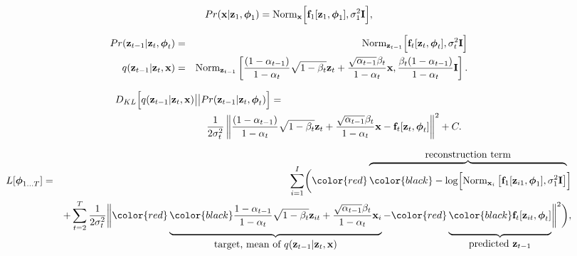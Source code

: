 \documentclass[letterpaper,twoside,openany, titlepage,oldfontcommands,titles,dvipsnames]{memoir}
\newcommand*\mystrut[1]{\vrule width0pt height0pt depth#1\relax}
\begin{document}
\begin{eqnarray}
  Pr(\mathbf{x}|\mathbf{z}_{1},\boldsymbol\phi_{1}) =\mbox{Norm}_{\mathbf{x}}\Bigl[\mbox{\bf f}_{1}[\mathbf{z}_{1},\boldsymbol\phi_{1}],\sigma_{1}^{2}\mathbf{I}\Bigr],
 \end{eqnarray}

\begin{eqnarray}\label{eq:diffusion_KL_normal_terms}
  Pr(\mathbf{z}_{t-1}|\mathbf{z}_{t},\boldsymbol\phi_{t}) &=& \mbox{Norm}_{\mathbf{z}_{t-1}}\Bigl[\mbox{\bf f}_{t}[\mathbf{z}_{t},\boldsymbol\phi_{t}],\sigma_{t}^{2}\mathbf{I}\Bigr]\\
 q(\mathbf{z}_{t-1}|\mathbf{z}_{t},\mathbf{x}) &=& \mbox{Norm}_{\mathbf{z}_{t-1}}\left[\frac{(1-\alpha_{t-1})}{1-\alpha_{t}}\sqrt{1-\beta_{t}}\mathbf{z}_{t}+\frac{\sqrt{\alpha_{t-1}}\beta_{t}}{1-\alpha_{t}}\mathbf{x},\frac{\beta_{t}(1-\alpha_{t-1})}{1-\alpha_{t}}\mathbf{I} \right].\nonumber
 \end{eqnarray}

\begin{eqnarray}\label{eq:diffusion_kl_1}
 D_{KL}\Bigl[q(\mathbf{z}_{t-1}|\mathbf{z}_{t},\mathbf{x})\bigl|\bigr|Pr(\mathbf{z}_{t-1}|\mathbf{z}_{t},\boldsymbol\phi_t)\Bigr] &=&\\
 &&\hspace{-3cm}\frac{1}{2\sigma_{t}^{2}}\left\lVert \frac{(1-\alpha_{t-1})}{1-\alpha_{t}}\sqrt{1-\beta_{t}}\mathbf{z}_{t}+\frac{\sqrt{\alpha_{t-1}}\beta_{t}}{1-\alpha_{t}}\mathbf{x}-\mbox{\bf f}_{t}[\mathbf{z}_{t},\boldsymbol\phi_{t}] \right\rVert^2+C.\nonumber
 \end{eqnarray}

\begin{eqnarray}\label{eq:diffusion_loss_function_1}
 L[\boldsymbol\phi_{1\ldots T}] &=& \sum_{i=1}^{I}\biggl(
 \begingroup\color{red}
 \overbrace{\color{black}\rule[0cm]{0mm}{0.6cm}-\log\Bigl[\mbox{Norm}_{\mathbf{x}_i}\left[\mbox{\bf f}_{1}[\mathbf{z}_{i1},\boldsymbol\phi_{1}],\sigma_{1}^{2}\mathbf{I}\right]}^{\mbox{reconstruction term}}
 \endgroup
 \Bigr]\\
 &&\vspace{-1.5cm}
  + \sum_{t=2}^{T}\frac{1}{2\sigma_{t}^{2}}\biggl\lVert
  \begingroup\color{red}
  \underbrace{\color{black}\mystrut{3.0ex}\frac{1-\alpha_{t-1}}{1-\alpha_{t}}\sqrt{1-\beta_{t}}\mathbf{z}_{it}+\frac{\sqrt{\alpha_{t-1}}\beta_{t}}{1-\alpha_{t}}\mathbf{x}_i}_{\mbox{target, mean of~$q(\mathbf{z}_{t-1}|\mathbf{z}_{t},\mathbf{x})$}}
  \endgroup
  -
  \begingroup\color{red}
  \underbrace{\color{black}\mystrut{3.0ex}\mbox{\bf f}_{t}[\mathbf{z}_{it},\boldsymbol\phi_{t}]}_{\mbox{predicted~$\mathbf{z}_{t-1}$}} 
  \endgroup
  \biggr\rVert^2\biggr),\nonumber
 \end{eqnarray}
\end{document}
